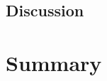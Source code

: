 \documentclass[11pt]{article}
\begin{document}
\subsection{Discussion}

\section{Summary}







\appendix
\renewcommand\thefigure{A.\arabic{figure}}  
\setcounter{figure}{0}
\end{document}
